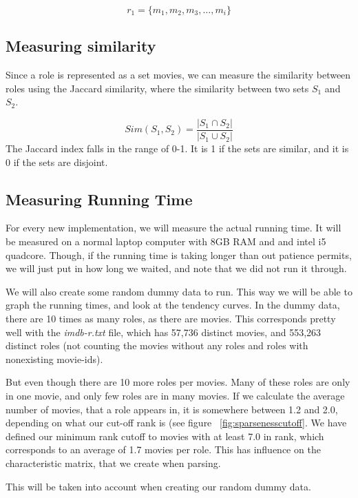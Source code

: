 \documentclass[a4paper,11pt]{article}
\begin{document}
\begin{equation}
r_1 = \{m_1, m_2, m_3, \ldots , m_i\}
\end{equation}

\subsection{Measuring similarity}
Since a role is represented as a set movies, we can measure the similarity between roles using the Jaccard similarity, where the similarity between two sets $S_1$ and $S_2$.

\begin{equation}
Sim(S_1, S_2) = \frac{|S_1 \cap S_2|}{|S_1 \cup S_2|}
\end{equation}
The Jaccard index falls in the range of 0-1. It is 1 if the sets are similar, and it is 0 if the sets are disjoint.


\subsection{Measuring Running Time}
For every new implementation, we will measure the actual running time. It will be measured on a normal laptop computer with 8GB RAM and and intel i5 quadcore. Though, if the running time is taking longer than out patience permits, we will just put in how long we waited, and note that we did not run it through.

We will also create some random dummy data to run. This way we will be able to graph the running times, and look at the tendency curves. In the dummy data, there are 10 times as many roles, as there are movies. This corresponds pretty well with the \emph{imdb-r.txt} file, which has 57,736 distinct movies, and 553,263 distinct roles (not counting the movies without any roles and roles with nonexisting movie-ids).

But even though there are 10 more roles per movies. Many of these roles are only in one movie, and only few roles are in many movies. If we calculate the average number of movies, that a role appears in, it is somewhere between 1.2 and 2.0, depending on what our cut-off rank is (see figure ~\ref{fig:sparsenesscutoff}. We have defined our minimum rank cutoff to movies with at least 7.0 in rank, which corresponds to an average of 1.7 movies per role. This has influence on the characteristic matrix, that we create when parsing.

This will be taken into account when creating our random dummy data.
\end{document}
